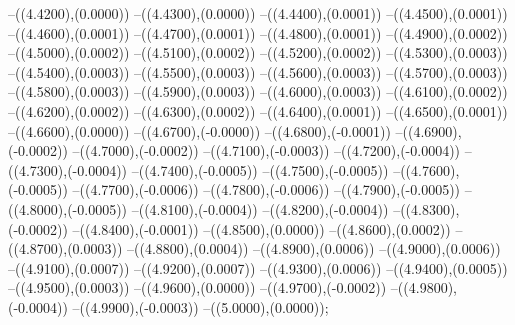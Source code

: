{	--({\sx*(4.4200)},{\sy*(0.0000)})
	--({\sx*(4.4300)},{\sy*(0.0000)})
	--({\sx*(4.4400)},{\sy*(0.0001)})
	--({\sx*(4.4500)},{\sy*(0.0001)})
	--({\sx*(4.4600)},{\sy*(0.0001)})
	--({\sx*(4.4700)},{\sy*(0.0001)})
	--({\sx*(4.4800)},{\sy*(0.0001)})
	--({\sx*(4.4900)},{\sy*(0.0002)})
	--({\sx*(4.5000)},{\sy*(0.0002)})
	--({\sx*(4.5100)},{\sy*(0.0002)})
	--({\sx*(4.5200)},{\sy*(0.0002)})
	--({\sx*(4.5300)},{\sy*(0.0003)})
	--({\sx*(4.5400)},{\sy*(0.0003)})
	--({\sx*(4.5500)},{\sy*(0.0003)})
	--({\sx*(4.5600)},{\sy*(0.0003)})
	--({\sx*(4.5700)},{\sy*(0.0003)})
	--({\sx*(4.5800)},{\sy*(0.0003)})
	--({\sx*(4.5900)},{\sy*(0.0003)})
	--({\sx*(4.6000)},{\sy*(0.0003)})
	--({\sx*(4.6100)},{\sy*(0.0002)})
	--({\sx*(4.6200)},{\sy*(0.0002)})
	--({\sx*(4.6300)},{\sy*(0.0002)})
	--({\sx*(4.6400)},{\sy*(0.0001)})
	--({\sx*(4.6500)},{\sy*(0.0001)})
	--({\sx*(4.6600)},{\sy*(0.0000)})
	--({\sx*(4.6700)},{\sy*(-0.0000)})
	--({\sx*(4.6800)},{\sy*(-0.0001)})
	--({\sx*(4.6900)},{\sy*(-0.0002)})
	--({\sx*(4.7000)},{\sy*(-0.0002)})
	--({\sx*(4.7100)},{\sy*(-0.0003)})
	--({\sx*(4.7200)},{\sy*(-0.0004)})
	--({\sx*(4.7300)},{\sy*(-0.0004)})
	--({\sx*(4.7400)},{\sy*(-0.0005)})
	--({\sx*(4.7500)},{\sy*(-0.0005)})
	--({\sx*(4.7600)},{\sy*(-0.0005)})
	--({\sx*(4.7700)},{\sy*(-0.0006)})
	--({\sx*(4.7800)},{\sy*(-0.0006)})
	--({\sx*(4.7900)},{\sy*(-0.0005)})
	--({\sx*(4.8000)},{\sy*(-0.0005)})
	--({\sx*(4.8100)},{\sy*(-0.0004)})
	--({\sx*(4.8200)},{\sy*(-0.0004)})
	--({\sx*(4.8300)},{\sy*(-0.0002)})
	--({\sx*(4.8400)},{\sy*(-0.0001)})
	--({\sx*(4.8500)},{\sy*(0.0000)})
	--({\sx*(4.8600)},{\sy*(0.0002)})
	--({\sx*(4.8700)},{\sy*(0.0003)})
	--({\sx*(4.8800)},{\sy*(0.0004)})
	--({\sx*(4.8900)},{\sy*(0.0006)})
	--({\sx*(4.9000)},{\sy*(0.0006)})
	--({\sx*(4.9100)},{\sy*(0.0007)})
	--({\sx*(4.9200)},{\sy*(0.0007)})
	--({\sx*(4.9300)},{\sy*(0.0006)})
	--({\sx*(4.9400)},{\sy*(0.0005)})
	--({\sx*(4.9500)},{\sy*(0.0003)})
	--({\sx*(4.9600)},{\sy*(0.0000)})
	--({\sx*(4.9700)},{\sy*(-0.0002)})
	--({\sx*(4.9800)},{\sy*(-0.0004)})
	--({\sx*(4.9900)},{\sy*(-0.0003)})
	--({\sx*(5.0000)},{\sy*(0.0000)});
}
